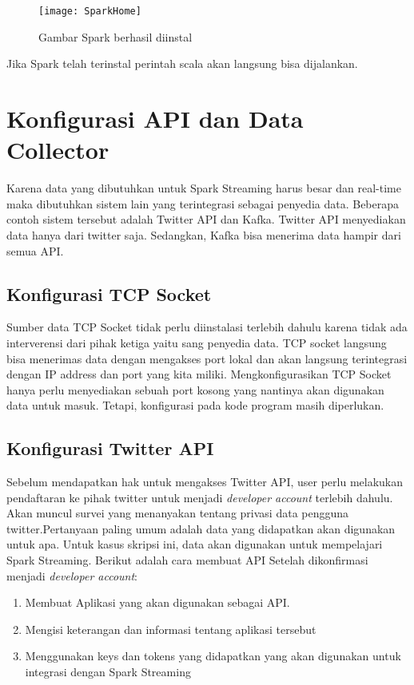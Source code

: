 \begin{figure}[H] 
	\centering  
	\texttt{[image: SparkHome]}  
	\caption[Gambar Spark]{Gambar Spark berhasil diinstal} 
	\label{fig:Hadoop-home} 
\end{figure}

Jika Spark telah terinstal perintah scala akan langsung bisa dijalankan.

\section{Konfigurasi API dan Data Collector}
Karena data yang dibutuhkan untuk Spark Streaming harus besar dan real-time maka dibutuhkan sistem lain yang terintegrasi sebagai penyedia data. Beberapa contoh sistem tersebut adalah Twitter API dan
Kafka. Twitter API menyediakan data hanya dari twitter saja. Sedangkan, Kafka bisa menerima data hampir dari semua API.

\subsection{Konfigurasi TCP Socket}
Sumber data TCP Socket tidak perlu diinstalasi terlebih dahulu karena tidak ada interverensi dari pihak ketiga yaitu sang penyedia data. TCP socket langsung bisa menerimas data dengan mengakses port lokal dan akan langsung terintegrasi dengan IP address dan port yang kita miliki. Mengkonfigurasikan TCP Socket hanya perlu menyediakan sebuah port kosong yang nantinya akan digunakan data untuk masuk. Tetapi, konfigurasi pada kode program masih diperlukan.


\subsection{Konfigurasi Twitter API}
Sebelum mendapatkan hak untuk mengakses Twitter API, user perlu melakukan pendaftaran ke pihak twitter untuk menjadi \textit{developer account} terlebih dahulu. Akan muncul survei yang menanyakan tentang privasi data pengguna twitter.Pertanyaan paling umum adalah data yang didapatkan akan digunakan untuk apa. Untuk kasus skripsi ini, data akan digunakan untuk mempelajari Spark Streaming. Berikut adalah cara membuat API Setelah dikonfirmasi menjadi \textit{developer account}:

\begin{enumerate}
	\item Membuat Aplikasi yang akan digunakan sebagai API.
	\item Mengisi keterangan dan informasi tentang aplikasi tersebut
	\item Menggunakan keys dan tokens yang didapatkan yang akan digunakan untuk integrasi dengan 			Spark Streaming
\end{enumerate} 

